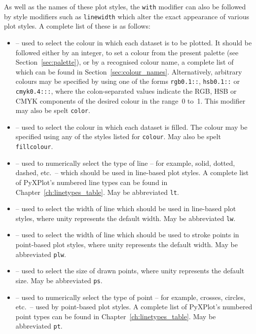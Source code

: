 As well as the names of these plot styles, the {\tt with} modifier can also be
followed by style modifiers such as {\tt line\-width} which alter the exact
appearance of various plot styles. A complete list of these is as follows:
\begin{itemize}
\item {} -- used to select the colour in which each dataset is to be plotted. It should be followed either by an integer, to set a colour from the present palette (see Section~\ref{sec:palette}), or by a recognised colour name, a complete list of which can be found in Section~\ref{sec:colour_names}. Alternatively, arbitrary colours may be specified by using one of the forms {\tt rgb0.1::}, {\tt hsb0.1::} or {\tt cmyk0.4:::}, where the colon-separated values indicate the RGB, HSB or CMYK components of the desired colour in the range~0 to~1. This modifier may also be spelt {\tt color}.
\item {} -- used to select the colour in which each dataset is filled. The colour may be specified using any of the styles listed for {\tt colour}. May also be spelt {\tt fillcolour}.
\item {} -- used to numerically select the type of line -- for example, solid, dotted, dashed, etc.\ -- which should be used in line-based plot styles. A complete list of PyXPlot's numbered line types can be found in Chapter~\ref{ch:linetypes_table}. May be abbreviated {\tt lt}.
\item {} -- used to select the width of line which should be used in line-based plot styles, where unity represents the default width. May be abbreviated {\tt lw}.
\item {} -- used to select the width of line which should be used to stroke points in point-based plot styles, where unity represents the default width. May be abbreviated {\tt plw}.
\item {} -- used to select the size of drawn points, where unity represents the default size. May be abbreviated {\tt ps}.
\item {} -- used to numerically select the type of point -- for example, crosses, circles, etc.\ -- used by point-based plot styles. A complete list of PyXPlot's numbered point types can be found in Chapter~\ref{ch:linetypes_table}. May be abbreviated {\tt pt}.
\end{itemize}

